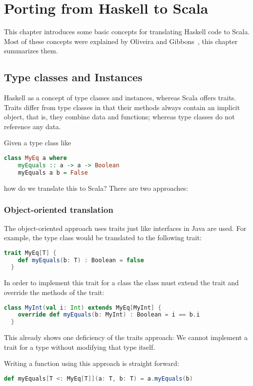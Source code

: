 \chapter{Porting from Haskell to Scala}

This chapter introduces some basic concepts for translating Haskell code
to Scala. Most of these concepts were explained by Oliveira and Gibbons~\cite{scalagp}, this
chapter summarizes them.

\section{Type classes and Instances}

Haskell as a concept of type classes and instances, whereas Scala offers
traits. Traits differ from type classes in that their methods always contain
an implicit  object, that is, they combine data and functions;
whereas type classes do not reference any data.

Given a type class like
\begin{lstlisting}[language=Haskell,gobble=2]
  class MyEq a where
    myEquals :: a -> a -> Boolean
    myEquals a b = False
\end{lstlisting}
how do we translate this to Scala? There are two approaches:

\subsection{Object-oriented translation}
The object-oriented approach uses traits just like interfaces in
Java are used. For example, the  type class would be translated
to the following trait:
\begin{lstlisting}[language=Scala,gobble=2]
  trait MyEq[T] {
    def myEquals(b: T) : Boolean = false
  }
\end{lstlisting}
In order to implement this trait for a class the class must extend the
trait and override the methods of the trait:
\begin{lstlisting}[language=Scala,gobble=2]
  class MyInt(val i: Int) extends MyEq[MyInt] {
    override def myEquals(b: MyInt) : Boolean = i == b.i
  }
\end{lstlisting}
This already shows one deficiency of the traits approach: We cannot
implement a trait for a type without modifying that type itself.

Writing a function using this approach is straight forward:
\begin{lstlisting}[language=Scala,gobble=2]
  def myEquals[T <: MyEq[T]](a: T, b: T) = a.myEquals(b)
\end{lstlisting}

